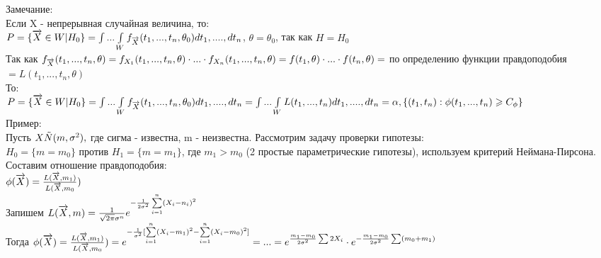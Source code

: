 Замечание:\\
Если X - непрерывная случайная величина, то:\\
$P = \{\overrightarrow{X} \in W | H_0\} = \int ... \int\limits_{W} f_{\overrightarrow{X}} (t_1, ..., t_n, \theta_0)dt_1, ...., dt_n$, $\theta = 	\theta_0$, так как $H = H_0$\\
Так как $f_{\overrightarrow{X}}(t_1, ..., t_n, \theta) = f_{X_1}(t_1, ..., t_n, \theta) \cdot ... \cdot f_{X_n}(t_1, ..., t_n, \theta) = f(t_1, \theta) \cdot ... \cdot f(t_n, \theta) = $ по определению функции правдоподобия $ = L(t_1, ..., t_n, \theta)$\\
То:\\
$P = \{\overrightarrow{X} \in W | H_0\} = \int ... \int\limits_{W} f_{\overrightarrow{X}} (t_1, ..., t_n, \theta_0)dt_1, ...., dt_n =  \int ... \int\limits_{W}L (t_1, ..., t_n)dt_1, ...., dt_n = \alpha, \{(t_1, t_n): \phi(t_1, ..., t_n) \geqslant C_\phi\}$\\

Пример:\\
Пусть $X \tilde N(m, \sigma^2),$ где сигма - известна, m - неизвестна. Рассмотрим задачу проверки гипотезы:\\
$H_0 = \{m = m_0\}$ против $H_1 = \{m = m_1\}$, где $m_1 > m_0$ (2 простые параметрические гипотезы), используем критерий Неймана-Пирсона. Составим отношение правдоподобия:\\
$\phi(\overrightarrow{X}) = \frac{L(\overrightarrow{X}, m_1)}{L(\overrightarrow{X}, m_0})$\\
Запишем $L(\overrightarrow{X}, m) = \frac{1}{\sqrt{2\pi} \sigma^n} e^{-\frac{1}{2\sigma^2} \sum\limits_{i=1}^{n}(X_i - n_i)^2}$\\

Тогда $\phi(\overrightarrow{X}) = \frac{L(\overrightarrow{X}, m_1)}{L(\overrightarrow{X}, m_0}) = e^{-\frac{1}{\sigma^2}[\sum\limits_{i=1}^{n}(X_i - m_1)^2 - \sum\limits_{i=1}^{n}(X_i - m_0)^2]} = ... = e^{\frac{m_1 - m_0}{2\sigma^2}\sum 2X_i} \cdot  e^{-\frac{m_1 - m_0}{2\sigma^2}\sum (m_0 + m_1)}$


























